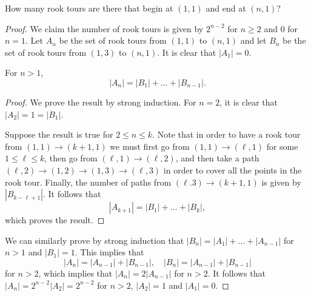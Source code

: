 \documentclass[11pt]{scrartcl}
\newcommand{\<}{\langle}
\renewcommand{\>}{\rangle}
\begin{document}
How many rook tours are there that begin at $(1,1)$ and end at $(n,1)?$

\begin{proof}
We claim the number of rook tours is given by $2^{n-2}$ for $n \ge 2$ and $0$ for $n = 1$.
Let $A_n$ be the set of rook tours from $(1, 1)$ to $(n, 1)$ and let $B_n$ be the set of rook tours from $(1, 3)$ to $(n, 1)$.  It is clear that $|A_1| = 0$.
\begin{lemma} For $n > 1$,
$$|A_n| = |B_1| + \dots + |B_{n-1}|.$$
\end{lemma}
\begin{proof}
We prove the result by strong induction.  For $n = 2$, it is clear that $|A_2| = 1 = |B_1|$.  

Suppose the result is true for $2 \le n \le k$.  Note that in order to have a rook tour from $(1, 1) \to (k+1, 1)$ we must first go from $(1, 1) \to (\ell, 1)$ for some $1 \le \ell \le k$, then go from $(\ell, 1) \to (\ell, 2)$, and then take a path $(\ell, 2) \to (1, 2) \to (1, 3) \to (\ell, 3)$ in order to cover all the points in the rook tour.  Finally, the number of paths from $(\ell. 3) \to (k +1, 1)$ is given by $|B_{k - \ell + 1}|$.  It follows that 
$$|A_{k + 1}| = |B_1| + \dots  + |B_k|,$$
which proves the result.  
\end{proof}

We can similarly prove by strong induction that $|B_n| = |A_1| + \dots + |A_{n-1}|$ for $n > 1$ and $|B_1| = 1$.  This implies that 
$$|A_n| = |A_{n-1}| + |B_{n-1}|, \quad |B_n| = |A_{n-1}| + |B_{n-1}|$$
for $n > 2$, which implies that $|A_n| = 2|A_{n-1}|$ for $n > 2$.  It follows that $|A_n| = 2^{n-2}|A_2| = 2^{n-2}$ for $n > 2$, $|A_2| = 1$ and $|A_1| = 0$.
\end{proof}
\pagebreak
\end{document}

